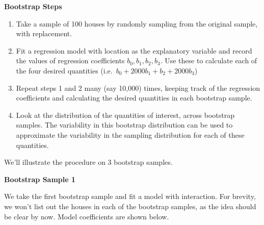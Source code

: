 \documentclass[
  letterpaper,
  DIV=11,
  numbers=noendperiod]{scrreprt}
\newenvironment{Shaded}{\begin{snugshade}}{\end{snugshade}}
\newcommand{\AttributeTok}[1]{\textcolor[rgb]{0.40,0.45,0.13}{#1}}
\newcommand{\CommentTok}[1]{\textcolor[rgb]{0.37,0.37,0.37}{#1}}
\newcommand{\ConstantTok}[1]{\textcolor[rgb]{0.56,0.35,0.01}{#1}}
\newcommand{\DecValTok}[1]{\textcolor[rgb]{0.68,0.00,0.00}{#1}}
\newcommand{\FunctionTok}[1]{\textcolor[rgb]{0.28,0.35,0.67}{#1}}
\newcommand{\NormalTok}[1]{\textcolor[rgb]{0.00,0.23,0.31}{#1}}
\newcommand{\OtherTok}[1]{\textcolor[rgb]{0.00,0.23,0.31}{#1}}
\newcommand{\SpecialCharTok}[1]{\textcolor[rgb]{0.37,0.37,0.37}{#1}}
\begin{document}
\textbf{Bootstrap Steps}

\begin{enumerate}
\def\labelenumi{\arabic{enumi}.}
\item
  Take a sample of 100 houses by randomly sampling from the original
  sample, with replacement.
\item
  Fit a regression model with location as the explanatory variable and
  record the values of regression coefficients \(b_0, b_1, b_2, b_3\).
  Use these to calculate each of the four desired quantities
  (i.e.~\(b_0 + 2000b_1 + b_2 +2000b_3\))
\item
  Repeat steps 1 and 2 many (say 10,000) times, keeping track of the
  regression coefficients and calculating the desired quantities in each
  bootstrap sample.
\item
  Look at the distribution of the quantities of interest, across
  bootstrap samples. The variability in this bootstrap distribution can
  be used to approximate the variability in the sampling distribution
  for each of these quantities.
\end{enumerate}

We'll illustrate the procedure on 3 bootstrap samples.

\textbf{Bootstrap Sample 1}

We take the first bootstrap sample and fit a model with interaction. For
brevity, we won't list out the houses in each of the bootstrap samples,
as the idea should be clear by now. Model coefficients are shown below.

\begin{Shaded}
\end{Shaded}
\end{document}
